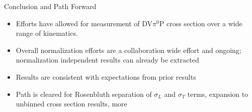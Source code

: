 \documentclass[aspectratio=169]{beamer}
\begin{document}
\begin{frame}{Conclusion and Path Forward}
\begin{itemize}
    \setlength\itemsep{1em}
    \item Efforts have allowed for measurement of DV$\pi^0$P cross section over a wide range of kinematics.
    \item Overall normalization efforts are a collaboration wide effort and ongoing; normalization independent results can already be extracted
    \item Results are consistent with expectations from prior results
    \item Path is cleared for Rosenbluth separation of $\sigma_L$ and $\sigma_T$ terms, expansion to unbinned cross section results, more
    
\end{itemize}


\end{frame}
    




\appendix
\end{document}
